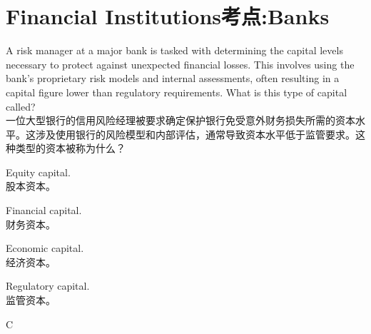 \documentclass{article}
\newcounter{question} %
\begin{document}
 \tableofcontents %
\newpage






\iftrue
\section{Financial Institutions考点:Banks}
\setcounter{question}{0}

\begin{question}
    A risk manager at a major bank is tasked with determining the capital levels necessary to protect against unexpected financial losses. This involves using the bank's proprietary risk models and internal assessments, often resulting in a capital figure lower than regulatory requirements. What is this type of capital called?
    \\一位大型银行的信用风险经理被要求确定保护银行免受意外财务损失所需的资本水平。这涉及使用银行的风险模型和内部评估，通常导致资本水平低于监管要求。这种类型的资本被称为什么？
\end{question}
    
\begin{choices}
    \item Equity capital.\\股本资本。
    \item Financial capital.\\财务资本。
    \item Economic capital.\\经济资本。
    \item Regulatory capital.\\监管资本。
\end{choices}
    
    \begin{correctanswer}
    C
    \end{correctanswer}
    
\end{document}
